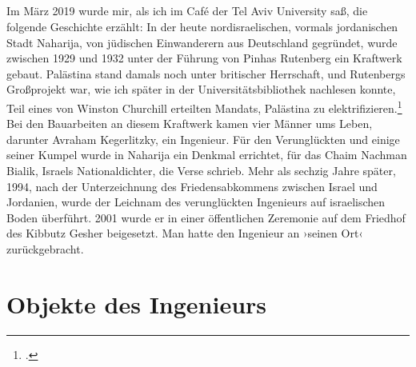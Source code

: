 \documentclass[%
	fontsize=10pt,%
	twoside,%
	headings=optiontoheadandtoc,%
	showtrims]{scrbook}
\newcommand{\antiqua}[3]{%
	\fontsize{#1}{#2}%
	\Lyon%
	\addfontfeature{LetterSpace=#3}%
	\selectfont%
}
\newcommand{\regularfontantiqua}{%
	\normalfont%
	\antiqua{9.3bp}{12bp}{.05}%
}
\newcommand{\regularfontdefault}{%
	\regularfontantiqua%
}
\begin{document}
\paragraph[\textemdash{}]{\textemdash{}}
\par Im März 2019 wurde mir, als ich im Café der Tel Aviv University saß, die folgende Geschichte erzählt: In der heute nordisraelischen, vormals jordanischen Stadt Naharija, von jüdischen Einwanderern aus Deutschland gegründet, wurde zwischen 1929 und 1932 unter der Führung von Pinhas Rutenberg ein Kraftwerk gebaut. Palästina stand damals noch unter britischer Herrschaft, und Rutenbergs Großprojekt war, wie ich später in der Universitätsbibliothek nachlesen konnte, Teil eines von Winston Churchill erteilten Mandats, Palästina zu elektrifizieren.\footnote{\cite[][]{shamir2017a}.}  Bei den Bauarbeiten an diesem Kraftwerk kamen vier Männer ums Leben, darunter Avraham Kegerlitzky, ein Ingenieur. Für den Verunglückten und einige seiner Kumpel wurde in Naharija ein Denkmal errichtet, für das Chaim Nachman Bialik, Israels Nationaldichter, die Verse schrieb. Mehr als sechzig Jahre später, 1994, nach der Unterzeichnung des Friedensabkommens zwischen Israel und Jordanien, wurde der Leichnam des verunglückten Ingenieurs auf israelischen Boden überführt. 2001 wurde er in einer öffentlichen Zeremonie auf dem Friedhof des Kibbutz Gesher beigesetzt. Man hatte den Ingenieur an ›seinen Ort‹ zurückgebracht.%
%
					
						\chapter[head={Objekte des Ingenieurs}, tocentry={OBJEKTE DES INGENIEURS}]{Objekte des Ingenieurs}%
					
					\-
					\par			
					\newpage%
					\noindent%
					\regularfontdefault%
	
\end{document}
